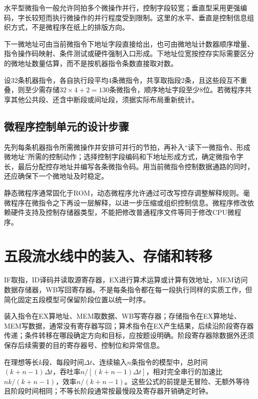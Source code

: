 水平型微指令一般允许同拍多个微操作并行，控制字段较宽；垂直型采用更强编码，字长较短而执行微操作的并行程度受到限制。这里的水平、垂直是控制信息组织方式，不是微程序在纸上的排版方向。

下一微地址可由当前微指令下地址字段直接给出，也可由微地址计数器顺序增量、指令操作码映射、条件测试或硬件强制入口形成。下地址位宽按控存实际需要区分的微地址数量估算，而不是按机器指令条数直接取对数。

设32条机器指令，各自执行段平均4条微指令，共享取指段2条，且这些段互不重叠，则至少需存储\(32\times4+2=130\)条微指令，顺序地址字段至少8位。若微程序共享其他公共段、还含中断段或间址段，须据实际布局重新统计。

\subsection{微程序控制单元的设计步骤}\label{CO05-microdesign-steps}

先列每条机器指令所需微操作并安排可并行的节拍，再补入``读下一微指令、形成微地址''所需的控制动作；选择控制字段编码和下地址形成方式，确定微指令字长，最后分配控存地址并编写各条微指令码。用当前微指令控制数据通路的同时，还应确保下一个微地址及时稳定。

静态微程序通常固化于ROM，动态微程序允许通过可改写控存调整解释规则。毫微程序在微指令之下再设一层解释，以进一步压缩或组织控制信息。微程序修改依赖硬件支持及控制存储器类型，不能把修改普通程序文件等同于修改CPU微程序。

\section{五段流水线中的装入、存储和转移}\label{CO05-five-stage-details}

IF取指，ID译码并读取源寄存器，EX进行算术运算或计算有效地址，MEM访问数据存储器，WB写回寄存器。不是每条指令都在每一段执行同样的实质工作，但简化固定五段模型可保留阶段位置以统一时序。

装入指令在EX算地址、MEM取数据、WB写寄存器；存储指令在EX算地址、MEM写数据，通常没有寄存器写回；算术指令在EX产生结果，后续沿阶段寄存器传递；条件转移在哪段确定方向和目标，应按题设明确。阶段寄存器除数据外还须保存后续需要的目的寄存器号、控制位和异常信息。

在理想等长\(k\)段、每段时间\(\Delta t\)、连续输入\(n\)条指令的模型中，总时间\((k+n-1)\Delta t\)，吞吐率\(n/[(k+n-1)\Delta t]\)，相对完全串行的加速比\(nk/(k+n-1)\)，效率\(n/(k+n-1)\)。这些公式的前提是无冒险、无额外等待且阶段时间相同；不等长阶段通常按最慢段及寄存器开销确定时钟。

